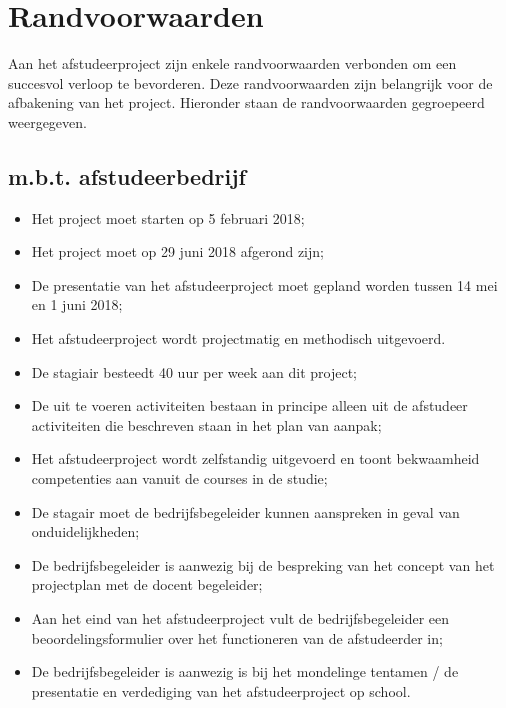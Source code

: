 \chapter{Randvoorwaarden}
Aan het afstudeerproject zijn enkele randvoorwaarden verbonden om een succesvol verloop te bevorderen. Deze randvoorwaarden zijn belangrijk voor de afbakening van het project. Hieronder staan de randvoorwaarden gegroepeerd weergegeven.\par

\section{m.b.t. afstudeerbedrijf}
\begin{itemize}
  \item Het project moet starten op 5 februari 2018;
  \item Het project moet op 29 juni 2018 afgerond zijn;
  \item De presentatie van het afstudeerproject moet gepland worden tussen 14 mei en 1 juni 2018;
  \item Het afstudeerproject wordt projectmatig en methodisch uitgevoerd.
  \item De stagiair besteedt 40 uur per week aan dit project;
  \item De uit te voeren activiteiten bestaan in principe alleen uit de afstudeer activiteiten die beschreven staan in het plan van aanpak;
  \item Het afstudeerproject wordt zelfstandig uitgevoerd en toont bekwaamheid competenties aan vanuit de courses in de studie;
  \item De stagair moet de bedrijfsbegeleider kunnen aanspreken in geval van onduidelijkheden;
  \item De bedrijfsbegeleider is aanwezig bij de bespreking van het concept van het projectplan met de docent begeleider;
  \item Aan het eind van het afstudeerproject vult de bedrijfsbegeleider een beoordelingsformulier over het functioneren van de afstudeerder in;
  \item De bedrijfsbegeleider is aanwezig is bij het mondelinge tentamen / de presentatie en verdediging van het afstudeerproject op school.
\end{itemize}

